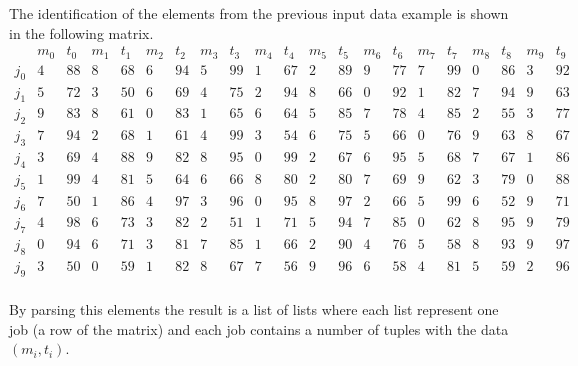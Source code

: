 \documentclass[11pt, a4paper]{article}
\begin{document}
The identification of the elements from the previous input data example is shown in the following matrix.
\[
\begin{array}{r|cccccccccccccccccccc}
     & m_0 & t_0 & m_1 & t_1 & m_2 & t_2 & m_3 & t_3 & m_4 & t_4 & m_5 & t_5 & m_6 & t_6 & m_7 & t_7 & m_8 & t_8 & m_9 & t_9 \\
\hline
j_0 & 4 & 88 & 8 & 68 & 6 & 94 & 5 & 99 & 1 & 67 & 2 & 89 & 9 & 77 & 7 & 99 & 0 & 86 & 3 & 92 \\
j_1 & 5 & 72 & 3 & 50 & 6 & 69 & 4 & 75 & 2 & 94 & 8 & 66 & 0 & 92 & 1 & 82 & 7 & 94 & 9 & 63 \\
j_2 & 9 & 83 & 8 & 61 & 0 & 83 & 1 & 65 & 6 & 64 & 5 & 85 & 7 & 78 & 4 & 85 & 2 & 55 & 3 & 77 \\
j_3 & 7 & 94 & 2 & 68 & 1 & 61 & 4 & 99 & 3 & 54 & 6 & 75 & 5 & 66 & 0 & 76 & 9 & 63 & 8 & 67 \\
j_4 & 3 & 69 & 4 & 88 & 9 & 82 & 8 & 95 & 0 & 99 & 2 & 67 & 6 & 95 & 5 & 68 & 7 & 67 & 1 & 86 \\
j_5 & 1 & 99 & 4 & 81 & 5 & 64 & 6 & 66 & 8 & 80 & 2 & 80 & 7 & 69 & 9 & 62 & 3 & 79 & 0 & 88 \\
j_6 & 7 & 50 & 1 & 86 & 4 & 97 & 3 & 96 & 0 & 95 & 8 & 97 & 2 & 66 & 5 & 99 & 6 & 52 & 9 & 71 \\
j_7 & 4 & 98 & 6 & 73 & 3 & 82 & 2 & 51 & 1 & 71 & 5 & 94 & 7 & 85 & 0 & 62 & 8 & 95 & 9 & 79 \\
j_8 & 0 & 94 & 6 & 71 & 3 & 81 & 7 & 85 & 1 & 66 & 2 & 90 & 4 & 76 & 5 & 58 & 8 & 93 & 9 & 97 \\
j_9 & 3 & 50 & 0 & 59 & 1 & 82 & 8 & 67 & 7 & 56 & 9 & 96 & 6 & 58 & 4 & 81 & 5 & 59 & 2 & 96 \\
\end{array}
\]

By parsing this elements the result is a list of lists where each list represent one job (a row of the matrix) and 
each job contains a number of tuples with the data \((m_{i}, t_{i})\).
\end{document}
